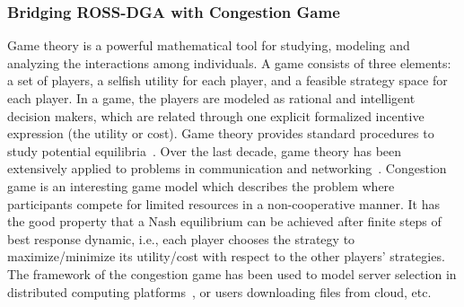 \documentclass[times]{ettauth}
\newcommand{\ie}{i.e., }
\theoremstyle{mytheoremstyle}
\theoremstyle{mytheoremstyle}
\theoremstyle{mytheoremstyle}
\begin{document}
\subsubsection{Bridging ROSS-DGA with Congestion Game}
\label{clustering:phaseII:game}
Game theory is a powerful mathematical tool for studying, modeling and analyzing the interactions among individuals.
A game consists of three elements: a set of players, a selfish utility for each player, and a feasible strategy space for each player. 
In a game, the players are modeled as rational and intelligent decision makers, which are related through one explicit formalized incentive expression (the utility or cost).
Game theory provides standard procedures to study potential equilibria~\cite{game_for_communication_01}.
Over the last decade, game theory has been extensively applied to problems in communication and networking~\cite{Neel06analysisand, Wang_gtc_crn_survey_2010}.
Congestion game is an interesting game model which describes the problem where participants compete for limited resources in a non-cooperative manner.
It has the good property that a Nash equilibrium can be achieved after finite steps of best response dynamic, \ie each player chooses the strategy to maximize/minimize its utility/cost with respect to the other players' strategies.
The framework of the congestion game has been used to model server selection in distributed computing platforms~\cite{Cloud_Computing_2010}, or users downloading files from cloud, etc.
\end{document}
